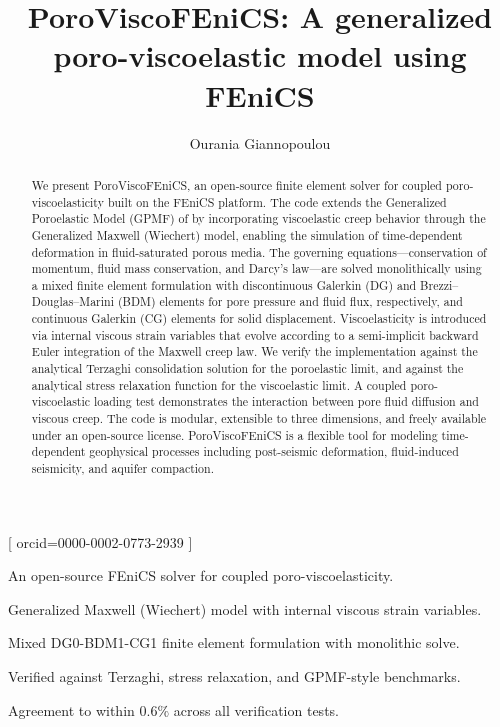 \documentclass[a4paper,fleqn,longmktitle]{cas-sc}
\begin{document}
\let\WriteBookmarks\relax
{}

\title [mode = title]{PoroViscoFEniCS: A generalized poro-viscoelastic model using FEniCS}

\author[1]{Ourania Giannopoulou}[%
orcid=0000-0002-0773-2939%
]
\address[1]{Independent Researcher, Rome, Italy}

\begin{abstract}
We present PoroViscoFEniCS, an open-source finite element solver for coupled
poro-viscoelasticity built on the FEniCS platform. The code extends the
Generalized Poroelastic Model (GPMF) of \citet{Haagenson2020} by
incorporating viscoelastic creep behavior through the Generalized Maxwell
(Wiechert) model, enabling the simulation of time-dependent deformation in
fluid-saturated porous media. The governing equations---conservation of
momentum, fluid mass conservation, and Darcy's law---are solved monolithically
using a mixed finite element formulation with discontinuous Galerkin (DG) and
Brezzi--Douglas--Marini (BDM) elements for pore pressure and fluid flux,
respectively, and continuous Galerkin (CG) elements for solid displacement.
Viscoelasticity is introduced via internal viscous strain variables that evolve
according to a semi-implicit backward Euler integration of the Maxwell creep
law. We verify the implementation against the analytical Terzaghi
consolidation solution for the poroelastic limit, and against the analytical
stress relaxation function for the viscoelastic limit. A coupled
poro-viscoelastic loading test demonstrates the interaction between pore fluid
diffusion and viscous creep. The code is modular, extensible to three
dimensions, and freely available under an open-source license. PoroViscoFEniCS
is a flexible tool for modeling time-dependent geophysical processes including
post-seismic deformation, fluid-induced seismicity, and aquifer
compaction.
\end{abstract}

\begin{highlights}
\item An open-source FEniCS solver for coupled poro-viscoelasticity.
\item Generalized Maxwell (Wiechert) model with internal viscous strain variables.
\item Mixed DG0-BDM1-CG1 finite element formulation with monolithic solve.
\item Verified against Terzaghi, stress relaxation, and GPMF-style benchmarks.
\item Agreement to within $0.6\%$ across all verification tests.
\end{highlights}
\end{document}
